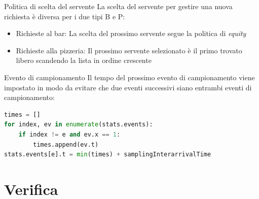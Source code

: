 \documentclass[xcolor=table]{beamer}
\newcommand{\key}[1]{\texttt{\StrSubstitute{#1}{_}{\_}}}
\begin{document}
\begin{frame}{Politica di scelta del servente}\justifying
La scelta del servente per gestire una nuova richiesta è diversa per i due tipi B e P:
\begin{itemize}
\item Richieste al bar: La scelta del prossimo servente segue la politica di \textit{equity}
\item Richieste alla pizzeria: Il prossimo servente selezionato è il primo trovato libero scandendo la lista in ordine crescente
\end{itemize}
\end{frame}

\begin{frame}[fragile]{Evento di campionamento}
\justifying
Il tempo del prossimo evento di campionamento viene impostato in modo da evitare che due eventi successivi siano entrambi eventi di campionamento:

\begin{lstlisting}[language=Python, firstnumber=242, title=\key{simulation.py}, tabsize=3,framexleftmargin={\dimexpr 1.5em+15pt}, xleftmargin={\dimexpr 1.5em+15pt},]
times = []
for index, ev in enumerate(stats.events):
	if index != e and ev.x == 1:
		times.append(ev.t)
stats.events[e].t = min(times) + samplingInterarrivalTime
\end{lstlisting}
\end{frame}


\section{Verifica}
\end{document}
